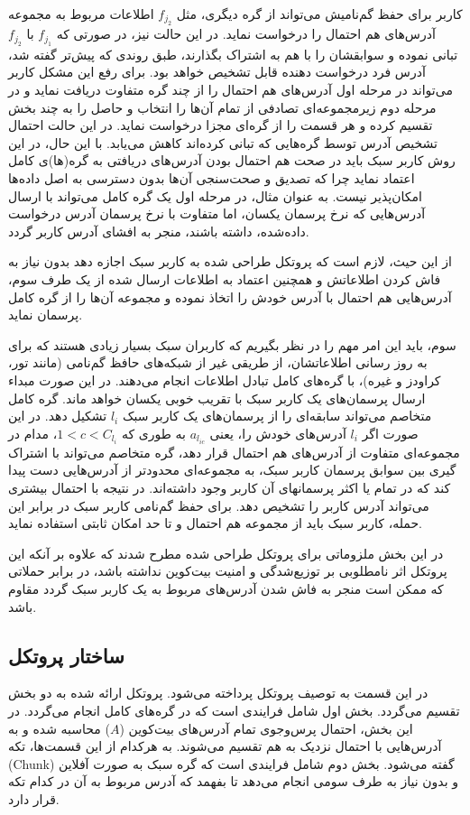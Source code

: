 کاربر برای حفظ گم‌نامیش می‌تواند از گره‌ دیگری، مثل $f_{j_2}$ اطلاعات مربوط به مجموعه آدرس‌های هم احتمال را درخواست نماید. در این حالت نیز، در صورتی که $f_{j_1}$ با $f_{j_2}$ تبانی نموده و سوابقشان را با هم به اشتراک بگذارند، طبق روندی که پیش‌تر گفته شد، آدرس فرد درخواست دهنده قابل تشخیص خواهد بود. برای رفع این مشکل کاربر می‌تواند در مرحله اول آدرس‌های هم احتمال را از چند گره متفاوت دریافت نماید و در مرحله دوم زیرمجموعه‌ای تصادفی از تمام آن‌ها را انتخاب و حاصل را به چند بخش تقسیم کرده و هر قسمت را از گره‌ای مجزا درخواست نماید. در این حالت احتمال تشخیص آدرس توسط گره‌هایی که تبانی کرده‌اند کاهش می‌یابد. با این حال، در این روش کاربر سبک باید در صحت هم احتمال بودن آدرس‌های دریافتی به گره‌(ها)ی کامل اعتماد نماید چرا که تصدیق و صحت‌سنجی آن‌ها بدون دسترسی به اصل داده‌ها امکان‌پذیر نیست. به عنوان مثال، در مرحله اول یک گره کامل می‌تواند با ارسال آدرس‌هایی که نرخ پرسمان یکسان، اما متفاوت با نرخ پرسمان آدرس درخواست داده‌شده، داشته باشند، منجر به افشای آدرس کاربر گردد.

از این حیث، لازم است که پروتکل طراحی شده به کاربر سبک اجازه دهد بدون نیاز به فاش کردن اطلاعاتش و همچنین اعتماد به اطلاعات ارسال شده از یک طرف سوم، آدرس‌هایی هم احتمال با آدرس خودش را اتخاذ نموده و مجموعه آن‌ها را از گره کامل پرسمان نماید.

سوم، باید این امر مهم را در نظر بگیریم که کاربران سبک بسیار زیادی هستند که برای به روز رسانی اطلاعاتشان، از طریقی غیر از شبکه‌های حافظ گم‌نامی (مانند تور\cite{torproject}، کراودز\cite{reiter1998crowds} و غیره)، با گره‌های کامل تبادل اطلاعات انجام می‌دهند. در این صورت مبداء ارسال پرسمان‌های یک کاربر سبک با تقریب خوبی یکسان خواهد ماند. گره کامل متخاصم می‌تواند سابقه‌ای را از پرسمان‌های یک کاربر سبک $l_i$ تشکیل دهد. در این صورت اگر $l_i$ آدرس‌های خودش را، یعنی
$a_{l_{ic}}$
به طوری که
$1<c<C_{l_i}$،
مدام در مجموعه‌ای متفاوت از آدرس‌های هم احتمال قرار دهد، گره متخاصم می‌تواند با اشتراک گیری بین سوابق پرسمان کاربر سبک، به مجموعه‌ای محدودتر از آدرس‌هایی دست پیدا کند که در تمام یا اکثر پرسمانهای آن کاربر وجود داشته‌اند. در نتیجه با احتمال بیشتری می‌تواند آدرس کاربر را تشخیص دهد. برای حفظ گم‌نامی کاربر سبک در برابر این حمله، کاربر سبک باید از مجموعه هم احتمال و تا حد امکان ثابتی استفاده نماید.

در این بخش ملزوماتی برای پروتکل طراحی شده مطرح شدند که علاوه بر آنکه این پروتکل اثر نامطلوبی بر توزیع‌شدگی و امنیت بیت‌کوین نداشته باشد، در برابر حملاتی که ممکن است منجر به فاش شدن آدرس‌های مربوط به یک کاربر سبک گردد مقاوم باشد.

\subsection{ساختار پروتکل}
در این قسمت به توصیف پروتکل پرداخته می‌شود. پروتکل ارائه شده به دو بخش تقسیم می‌گردد. بخش اول شامل فرایندی است که در گره‌های کامل انجام می‌گردد. در این بخش، احتمال پرس‌وجوی تمام آدرس‌های بیت‌کوین ($A$) محاسبه شده و به آدرس‌هایی با احتمال نزدیک به هم تقسیم می‌شوند. به هرکدام از این قسمت‌ها، تکه‌ (Chunk) گفته می‌شود. بخش دوم شامل فرایندی است که گره سبک به صورت آفلاین و بدون نیاز به طرف سومی انجام می‌دهد تا بفهمد که آدرس مربوط به آن در کدام تکه قرار دارد.

